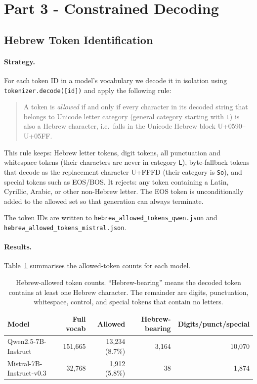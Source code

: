 \documentclass[11pt, a4paper]{article}
\begin{document}
\newpage
\section{Part 3 - Constrained Decoding}

\subsection{Hebrew Token Identification}

\paragraph{Strategy.}
For each token ID in a model's vocabulary we decode it in isolation using
\texttt{tokenizer.decode([id])} and apply the following rule:

\begin{quote}
A token is \emph{allowed} if and only if every character in its decoded string
that belongs to Unicode letter category (general category starting with
\texttt{L}) is also a Hebrew character, i.e.\ falls in the Unicode Hebrew block
U+0590--U+05FF.
\end{quote}

This rule keeps: Hebrew letter tokens, digit tokens, all punctuation and
whitespace tokens (their characters are never in category \texttt{L}),
byte-fallback tokens that decode as the replacement character U+FFFD (their
category is \texttt{So}), and special tokens such as EOS/BOS.
It rejects: any token containing a Latin, Cyrillic, Arabic, or other non-Hebrew
letter.
The EOS token is unconditionally added to the allowed set so that generation can
always terminate.

The token IDs are written to \texttt{hebrew\_allowed\_tokens\_qwen.json} and
\texttt{hebrew\_allowed\_tokens\_mistral.json}.

\paragraph{Results.}
Table~\ref{tab:hebrew-tokens} summarises the allowed-token counts for each model.

\begin{table}[H]
\centering
\begin{tabular}{lrrrr}
\toprule
Model & Full vocab & Allowed & Hebrew-bearing & Digits/punct/special \\
\midrule
Qwen2.5-7B-Instruct       & 151,665 & 13,234 (8.7\%) & 3,164 & 10,070 \\
Mistral-7B-Instruct-v0.3  &  32,768 &  1,912 (5.8\%) &    38 &  1,874 \\
\bottomrule
\end{tabular}
\caption{Hebrew-allowed token counts. ``Hebrew-bearing'' means the decoded token
contains at least one Hebrew character. The remainder are digits, punctuation,
whitespace, control, and special tokens that contain no letters.}
\label{tab:hebrew-tokens}
\end{table}
\end{document}
